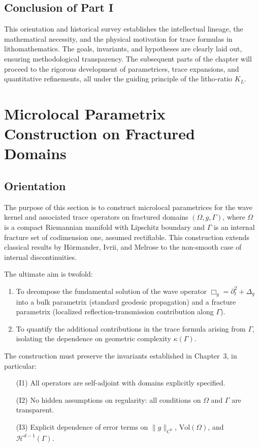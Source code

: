 \subsection*{Conclusion of Part I}

This orientation and historical survey establishes the intellectual lineage, the mathematical necessity, and the physical motivation for trace formulas in lithomathematics. The goals, invariants, and hypotheses are clearly laid out, ensuring methodological transparency. The subsequent parts of the chapter will proceed to the rigorous development of parametrices, trace expansions, and quantitative refinements, all under the guiding principle of the litho-ratio $K_L$.

\section{Microlocal Parametrix Construction on Fractured Domains}

\subsection*{Orientation}

The purpose of this section is to construct microlocal parametrices for the wave kernel and associated trace operators on fractured domains $(\Omega, g, \Gamma)$, where $\Omega$ is a compact Riemannian manifold with Lipschitz boundary and $\Gamma$ is an internal fracture set of codimension one, assumed rectifiable. This construction extends classical results by Hörmander, Ivrii, and Melrose to the non-smooth case of internal discontinuities. 

The ultimate aim is twofold:

\begin{enumerate}[label=(G\arabic*)]
\item To decompose the fundamental solution of the wave operator $\Box_g = \partial_t^2 + \Delta_g$ into a bulk parametrix (standard geodesic propagation) and a fracture parametrix (localized reflection-transmission contribution along $\Gamma$).
\item To quantify the additional contributions in the trace formula arising from $\Gamma$, isolating the dependence on geometric complexity $\kappa(\Gamma)$.
\end{enumerate}

The construction must preserve the invariants established in Chapter~3, in particular:

\begin{itemize}
\item[(I1)] All operators are self-adjoint with domains explicitly specified.
\item[(I2)] No hidden assumptions on regularity: all conditions on $\Omega$ and $\Gamma$ are transparent.
\item[(I3)] Explicit dependence of error terms on $\|g\|_{C^k}$, $\mathrm{Vol}(\Omega)$, and $\mathcal{H}^{d-1}(\Gamma)$.
\end{itemize}

